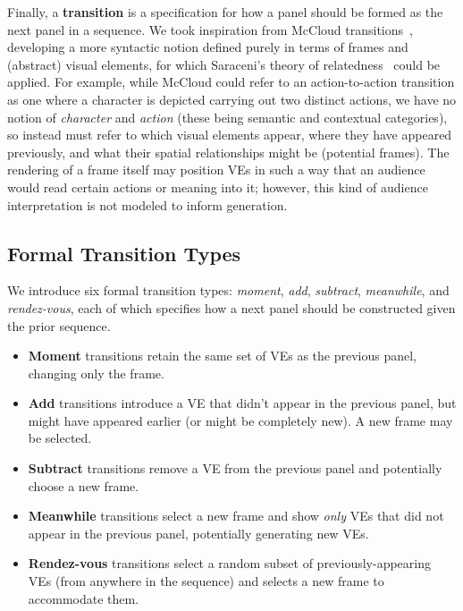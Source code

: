 Finally, a {\bf transition} is a specification for how a panel should be
formed as the next panel in a sequence.
%
We took inspiration from McCloud
transitions~\cite{mcCloud1993understanding}, developing a more
syntactic notion  defined purely in terms of frames and (abstract) visual
elements, for which Saraceni's theory of
relatedness~\cite{saraceni2016relatedness} could be applied. For example,
while McCloud could refer to an action-to-action transition as one where a
character is depicted carrying out two distinct actions, we have no notion
of {\em character} and {\em action} (these being semantic and contextual
categories), so instead must refer to which visual elements appear, where
they have appeared previously, and what their spatial relationships might
be (potential frames). The rendering of a frame itself may position VEs in
such a way that an audience would read certain actions or meaning into it;
however, this kind of audience interpretation is not modeled to inform
generation.

\subsection{Formal Transition Types}

We introduce six formal transition types: {\em moment}, {\em add}, {\em
subtract}, {\em meanwhile}, and {\em rendez-vous}, each of which specifies
how a next panel should be constructed given the prior sequence.

\begin{itemize}
\item {\bf Moment} transitions retain the same set of VEs as the previous panel, 
changing only the frame.

\item {\bf Add} transitions introduce a VE that didn't appear in the
previous panel, but might have appeared earlier (or might be completely
new). A new frame may be selected.

\item {\bf Subtract} transitions remove a VE from the previous panel and
potentially choose a new frame.

\item {\bf Meanwhile} transitions select a new frame and show {\em only}
VEs that did not appear in the previous panel, potentially generating new
VEs.

\item {\bf Rendez-vous} transitions select a random subset of
previously-appearing VEs (from anywhere in the sequence) and selects a new
frame to accommodate them.
\end{itemize}

